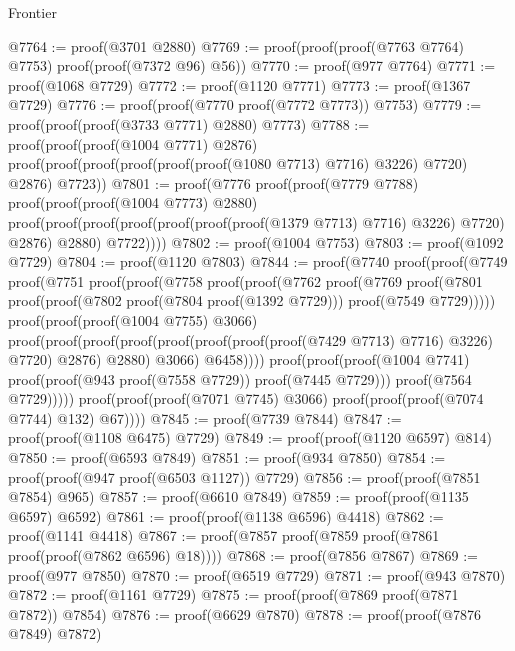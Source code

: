 \begin{lexlean}{Frontier}
\begin{coremodule}
@7764 := proof(@3701 @2880)
@7769 := proof(proof(proof(@7763 @7764) @7753) proof(proof(@7372 @96) @56))
@7770 := proof(@977 @7764)
@7771 := proof(@1068 @7729)
@7772 := proof(@1120 @7771)
@7773 := proof(@1367 @7729)
@7776 := proof(proof(@7770 proof(@7772 @7773)) @7753)
@7779 := proof(proof(proof(@3733 @7771) @2880) @7773)
@7788 := proof(proof(proof(@1004 @7771) @2876)
      proof(proof(proof(proof(proof(proof(@1080 @7713) @7716) @3226) @7720) @2876) @7723))
@7801 := proof(@7776
      proof(proof(@7779 @7788)
          proof(proof(proof(@1004 @7773) @2880)
              proof(proof(proof(proof(proof(proof(proof(@1379 @7713) @7716) @3226) @7720) @2876)
                    @2880)
                  @7722))))
@7802 := proof(@1004 @7753)
@7803 := proof(@1092 @7729)
@7804 := proof(@1120 @7803)
@7844 := proof(@7740
      proof(proof(@7749
            proof(@7751
                proof(proof(@7758
                      proof(proof(@7762
                            proof(@7769
                                proof(@7801
                                    proof(proof(@7802 proof(@7804 proof(@1392 @7729)))
                                        proof(@7549 @7729)))))
                          proof(proof(proof(@1004 @7755) @3066)
                              proof(proof(proof(proof(proof(proof(proof(proof(@7429 @7713) @7716)
                                            @3226)
                                          @7720)
                                        @2876)
                                      @2880)
                                    @3066)
                                  @6458))))
                    proof(proof(proof(@1004 @7741)
                          proof(proof(@943 proof(@7558 @7729)) proof(@7445 @7729)))
                        proof(@7564 @7729)))))
          proof(proof(proof(@7071 @7745) @3066) proof(proof(proof(@7074 @7744) @132) @67))))
@7845 := proof(@7739 @7844)
@7847 := proof(proof(@1108 @6475) @7729)
@7849 := proof(proof(@1120 @6597) @814)
@7850 := proof(@6593 @7849)
@7851 := proof(@934 @7850)
@7854 := proof(proof(@947 proof(@6503 @1127)) @7729)
@7856 := proof(proof(@7851 @7854) @965)
@7857 := proof(@6610 @7849)
@7859 := proof(proof(@1135 @6597) @6592)
@7861 := proof(proof(@1138 @6596) @4418)
@7862 := proof(@1141 @4418)
@7867 := proof(@7857 proof(@7859 proof(@7861 proof(proof(@7862 @6596) @18))))
@7868 := proof(@7856 @7867)
@7869 := proof(@977 @7850)
@7870 := proof(@6519 @7729)
@7871 := proof(@943 @7870)
@7872 := proof(@1161 @7729)
@7875 := proof(proof(@7869 proof(@7871 @7872)) @7854)
@7876 := proof(@6629 @7870)
@7878 := proof(proof(@7876 @7849) @7872)

\end{coremodule}
\end{lexlean}
